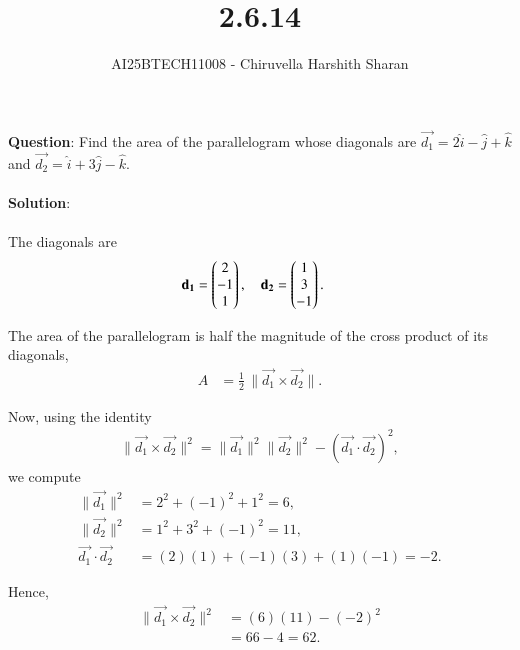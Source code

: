 \documentclass[journal]{IEEEtran}
\begin{document}

\vspace{3cm}

\title{2.6.14}
\author{AI25BTECH11008 - Chiruvella Harshith Sharan}
{\let\newpage\relax\maketitle}

\renewcommand{\thefigure}{\theenumi}
\renewcommand{\thetable}{\theenumi}
\setlength{\intextsep}{10pt} 

\renewcommand{\theequation}{\arabic{equation}}
\setcounter{equation}{0}

\textbf{Question}: Find the area of the parallelogram whose diagonals are 
$\vec{d_1} = 2\hat{i} - \hat{j} + \hat{k}$ and      
$\vec{d_2} = \hat{i} + 3\hat{j} - \hat{k}$. \\\\[0.3cm]

\textbf{Solution}: \\\\[0.3cm]

The diagonals are 
\begin{align}
\mathbf{d_1} &= \begin{pmatrix}2 \\ -1 \\ 1\end{pmatrix}, 
\quad 
\mathbf{d_2} = \begin{pmatrix}1 \\ 3 \\ -1\end{pmatrix}.
\end{align}

\vspace{0.3cm}

The area of the parallelogram is half the magnitude of the cross product of its diagonals,
\begin{align}
A &= \frac{1}{2}\,\|\vec{d_1} \times \vec{d_2}\|.
\end{align}

Now, using the identity
\begin{align}
\|\vec{d_1} \times \vec{d_2}\|^2 
= \|\vec{d_1}\|^2 \|\vec{d_2}\|^2 - (\vec{d_1}\cdot \vec{d_2})^2,
\end{align}
we compute
\begin{align}
\|\vec{d_1}\|^2 &= 2^2 + (-1)^2 + 1^2 = 6, \\
\|\vec{d_2}\|^2 &= 1^2 + 3^2 + (-1)^2 = 11, \\
\vec{d_1}\cdot \vec{d_2} &= (2)(1) + (-1)(3) + (1)(-1) = -2.
\end{align}

Hence,
\begin{align}
\|\vec{d_1} \times \vec{d_2}\|^2 &= (6)(11) - (-2)^2 \\
&= 66 - 4 = 62.
\end{align}
\end{document}
